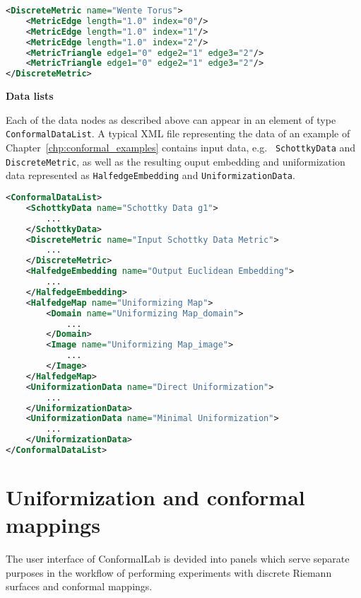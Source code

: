 \documentclass[Thesis.tex]{subfiles}
\begin{document}
\begin{lstlisting}[label=lst:discretemetric_xml, caption={A wente torus given by a discrete metric. Vertices are given implictly
by following the order of triangle glueings.}, numbers=none, language=XML, captionpos=b]
<DiscreteMetric name="Wente Torus">
	<MetricEdge length="1.0" index="0"/>
	<MetricEdge length="1.0" index="1"/>
	<MetricEdge length="1.0" index="2"/>
	<MetricTriangle edge1="0" edge2="1" edge3="2"/>
	<MetricTriangle edge1="0" edge2="1" edge3="2"/>
</DiscreteMetric>
\end{lstlisting}

{\bf Data lists}

Each of the data nodes as described above can appear in an element of type {\tt
ConformalDataList}. A typical XML file representing the data of an example of
Chapter~\ref{chp:conformal_examples} contains input data, e.g. {\tt
SchottkyData} and {\tt DiscreteMetric}, as well as the resulting ouput
embedding and uniformization data represented as {\tt HalfedgeEmbedding} and
{\tt UniformizationData}.

\begin{lstlisting}[label=lst:datalist_xml, caption={A list of data XML nodes as the result of an algorithm calculating the Fuchsian uniformization of a genus $1$ Riemann surface given by Schottky data.}, numbers=none, language=XML, captionpos=b]
<ConformalDataList>
	<SchottkyData name="Schottky Data g1">
		...
	</SchottkyData>
	<DiscreteMetric name="Input Schottky Data Metric">
		...
	</DiscreteMetric>
	<HalfedgeEmbedding name="Output Euclidean Embedding">
		...
	</HalfedgeEmbedding>
	<HalfedgeMap name="Uniformizing Map">
		<Domain name="Uniformizing Map_domain">
			...
		</Domain>
		<Image name="Uniformizing Map_image">
			...
		</Image>
	</HalfedgeMap>
	<UniformizationData name="Direct Uniformization">
		...
	</UniformizationData>
	<UniformizationData name="Minimal Uniformization">
		...
	</UniformizationData>
</ConformalDataList>
\end{lstlisting}

\section{Uniformization and conformal mappings} \label{sec:conformallab_ui} The
user interface of {\sc ConformalLab} is devided into panels which serve
separate purposes in the workflow of performing experiments with discrete
Riemann surfaces and conformal mappings.

\newpage
\end{document}
